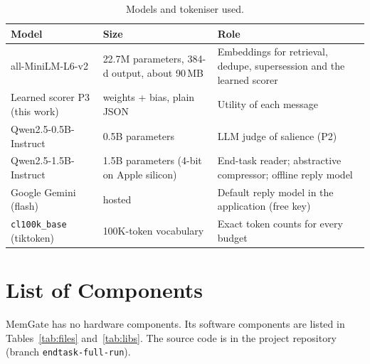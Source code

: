\begin{table}[htbp]
\caption{Models and tokeniser used.}
\label{tab:models}
\centering
\fontsize{9}{11}\selectfont
\begin{tabularx}{\textwidth}{@{}>{\raggedright\arraybackslash}p{3.8cm}>{\raggedright\arraybackslash}p{3.6cm}>{\raggedright\arraybackslash}X@{}}
\toprule
\textbf{Model} & \textbf{Size} & \textbf{Role} \\
\midrule
all-MiniLM-L6-v2 \cite{reimers2019sbert,wang2020minilm} & 22.7M parameters, 384-d output, about 90\,MB & Embeddings for retrieval, dedupe, supersession and the learned scorer \\
Learned scorer P3 (this work) & 399 weights + bias, plain JSON & Utility of each message \\
Qwen2.5-0.5B-Instruct \cite{qwen2025} & 0.5B parameters & LLM judge of salience (P2) \\
Qwen2.5-1.5B-Instruct \cite{qwen2025} & 1.5B parameters (4-bit on Apple silicon) & End-task reader; abstractive compressor; offline reply model \\
Google Gemini (flash) \cite{gemini2023} & hosted & Default reply model in the application (free key) \\
\texttt{cl100k\_base} (tiktoken) & 100K-token vocabulary & Exact token counts for every budget \\
\bottomrule
\end{tabularx}
\end{table}

\chapter{List of Components}
\label{app:components}

MemGate has no hardware components. Its software components are listed in
Tables~\ref{tab:files} and~\ref{tab:libs}. The source code is in the
project repository (branch \texttt{endtask-full-run}).

